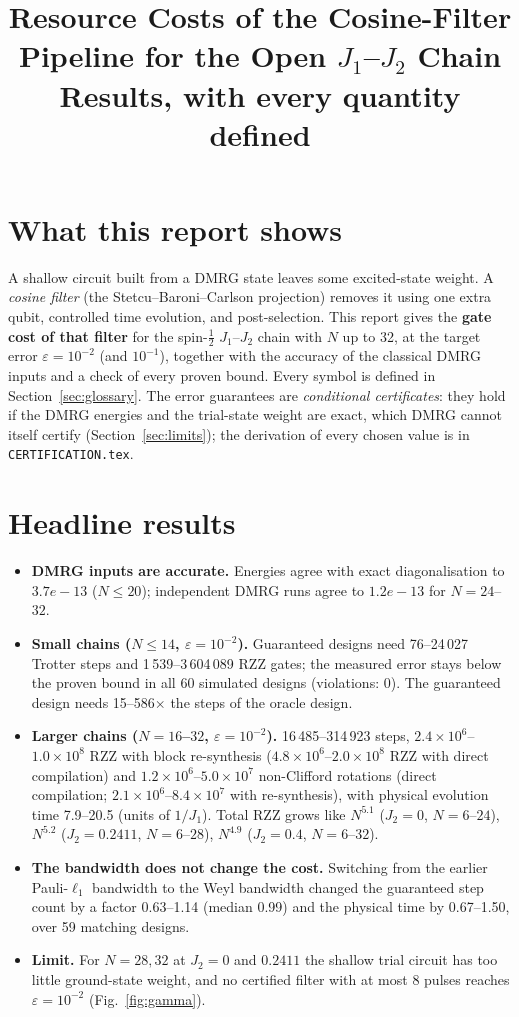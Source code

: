 \documentclass[11pt]{article}
\title{Resource Costs of the Cosine-Filter Pipeline for the Open $J_1$--$J_2$ Chain\\[2pt]\large Results, with every quantity defined}
\author{}
\date{}
\begin{document}
\maketitle

\section{What this report shows}
A shallow circuit built from a DMRG state leaves some excited-state weight. A \emph{cosine filter} (the Stetcu--Baroni--Carlson projection) removes it using one extra qubit, controlled time evolution, and post-selection. This report gives the \textbf{gate cost of that filter} for the spin-$\tfrac12$ $J_1$--$J_2$ chain with $N$ up to 32, at the target error $\varepsilon=10^{-2}$ (and $10^{-1}$), together with the accuracy of the classical DMRG inputs and a check of every proven bound. Every symbol is defined in Section~\ref{sec:glossary}. The error guarantees are \emph{conditional certificates}: they hold if the DMRG energies and the trial-state weight are exact, which DMRG cannot itself certify (Section~\ref{sec:limits}); the derivation of every chosen value is in \texttt{CERTIFICATION.tex}.

\section{Headline results}
\begin{itemize}
\item \textbf{DMRG inputs are accurate.} Energies agree with exact diagonalisation to $3.7e-13$ ($N\leq20$); independent DMRG runs agree to $1.2e-13$ for $N=24$--$32$.
\item \textbf{Small chains ($N\leq14$, $\varepsilon=10^{-2}$).} Guaranteed designs need 76--24\,027 Trotter steps and 1\,539--3\,604\,089 RZZ gates; the measured error stays below the proven bound in all 60 simulated designs (violations: 0). The guaranteed design needs 15--586$\times$ the steps of the oracle design.
\item \textbf{Larger chains ($N=16$--$32$, $\varepsilon=10^{-2}$).} 16\,485--314\,923 steps, $2.4\times10^{6}$--$1.0\times10^{8}$ RZZ with block re-synthesis ($4.8\times10^{6}$--$2.0\times10^{8}$ RZZ with direct compilation) and $1.2\times10^{6}$--$5.0\times10^{7}$ non-Clifford rotations (direct compilation; $2.1\times10^{6}$--$8.4\times10^{7}$ with re-synthesis), with physical evolution time 7.9--20.5 (units of $1/J_1$). Total RZZ grows like $N^{5.1}$ ($J_2=0$, $N=6$--$24$), $N^{5.2}$ ($J_2=0.2411$, $N=6$--$28$), $N^{4.9}$ ($J_2=0.4$, $N=6$--$32$).
\item \textbf{The bandwidth does not change the cost.} Switching from the earlier Pauli-$\ell_1$ bandwidth to the Weyl bandwidth changed the guaranteed step count by a factor 0.63--1.14 (median 0.99) and the physical time by 0.67--1.50, over 59 matching designs.
\item \textbf{Limit.} For $N=28,32$ at $J_2=0$ and $0.2411$ the shallow trial circuit has too little ground-state weight, and no certified filter with at most 8 pulses reaches $\varepsilon=10^{-2}$ (Fig.~\ref{fig:gamma}).
\end{itemize}
\end{document}
